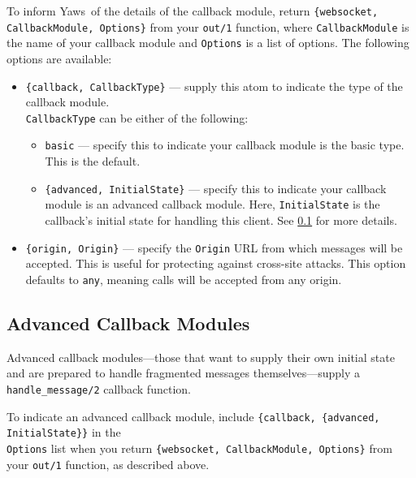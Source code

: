 \documentclass[11pt,oneside,english]{book}
\newcommand{\Yaws}            %
        {{\sc Yaws}}
\begin{document}
To inform \Yaws\ of the details of the callback module, return
\verb+{websocket, CallbackModule, Options}+ from your \verb+out/1+
function, where \verb+CallbackModule+ is the name of your callback
module and \verb+Options+ is a list of options. The following options
are available:

\begin{itemize}

\item \verb+{callback, CallbackType}+ --- supply this atom to indicate
  the type of the callback module. \\ \verb+CallbackType+ can be
  either of the following:

\begin{itemize}

\item \verb+basic+ --- specify this to indicate your callback module
  is the basic type. This is the default.

\item \verb+{advanced, InitialState}+ --- specify this to indicate
  your callback module is an advanced callback module. Here,
  \verb+InitialState+ is the callback's initial state for handling
  this client. See \ref{advanced_ws} for more details.

\end{itemize}

\item \verb+{origin, Origin}+ --- specify the \verb+Origin+ URL from
  which messages will be accepted. This is useful for protecting
  against cross-site attacks. This option defaults to \verb+any+,
  meaning calls will be accepted from any origin.

\end{itemize}

\subsection{Advanced Callback Modules}
\label{advanced_ws}

Advanced callback modules---those that want to supply their own
initial state and are prepared to handle fragmented messages
themselves---supply a \verb+handle_message/2+ callback function.

To indicate an advanced callback module, include
\verb+{callback, {advanced, InitialState}}+ in the \\ \verb+Options+
list when you return \verb+{websocket, CallbackModule, Options}+ from
your \verb+out/1+ function, as described above.
\end{document}
